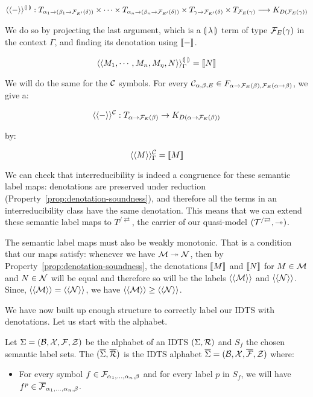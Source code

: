 $$
\langle\langle-\rangle\rangle^{\llparenthesis \,  \, \rrparenthesis} : T_{\alpha_1 \to (\beta_1 \to \mathcal{F}_{E'}(\delta))}
\times \cdots \times T_{\alpha_n \to (\beta_n \to \mathcal{F}_{E'}(\delta))} \times
T_{\gamma \to \mathcal{F}_{E'}(\delta)} \times T_{\mathcal{F}_E(\gamma)} \longrightarrow
K_{D(\mathcal{F}_E(\gamma))}
$$

We do so by projecting the last argument, which is a $\llparenthesis \, \lambda \, \rrparenthesis$
term of type $\mathcal{F}_E(\gamma)$ in the context $\Gamma$, and finding its
denotation using $\llbracket - \rrbracket$.

$$
\langle\langle M_1, \cdots, M_n, M_\eta, N\rangle\rangle^{\llparenthesis \,  \, \rrparenthesis}_\Gamma = \llbracket N \rrbracket
$$

We will do the same for the $\mathcal{C}$ symbols. For every
$\mathcal{C}_{\alpha,\beta,E} \in F_{\alpha \to \mathcal{F}_E(\beta),\mathcal{F}_E(\alpha \to
  \beta)}$, we give a:

$$
\langle\langle-\rangle\rangle^{\mathcal{C}} : T_{\alpha \to \mathcal{F}_E(\beta)} \to K_{D(\alpha \to \mathcal{F}_E(\beta))}
$$

by:

$$
\langle\langle M\rangle\rangle^{\mathcal{C}}_\Gamma = \llbracket M \rrbracket
$$

We can check that interreducibility is indeed a congruence for these
semantic label maps: denotations are preserved under reduction
(Property~\ref{prop:denotation-soundness}), and therefore all the terms in
an interreducibility class have the same denotation. This means that we can
extend these semantic label maps to $T^{/\rightleftarrows}$, the carrier of
our quasi-model $(\mathcal{T}^{/\rightleftarrows}, \twoheadrightarrow)$.

The semantic label maps must also be weakly monotonic. That is a condition
that our maps satisfy: whenever we have $\mathcal{M} \twoheadrightarrow \mathcal{N}$, then by
Property~\ref{prop:denotation-soundness}, the denotations $\llbracket M \rrbracket$ and
$\llbracket N \rrbracket$ for $M \in \mathcal{M}$ and $N \in \mathcal{N}$ will be equal and therefore so
will be the labels $\langle\langle\mathcal{M}\rangle\rangle$ and $\langle\langle\mathcal{N}\rangle\rangle$. Since,
$\langle\langle\mathcal{M}\rangle\rangle = \langle\langle\mathcal{N}\rangle\rangle$, we have $\langle\langle\mathcal{M}\rangle\rangle \ge \langle\langle\mathcal{N}\rangle\rangle$.

We have now built up enough structure to correctly label our IDTS with
denotations. Let us start with the alphabet.

\begin{definition}
  Let $\Sigma = (\mathcal{B}, \mathcal{X}, \mathcal{F}, \mathcal{Z})$ be the alphabet of an IDTS
  $(\Sigma, \mathcal{R})$ and $S_f$ the chosen semantic label sets. The
  $(\overline{\Sigma}, \overline{\mathcal{R}})$ is the IDTS alphabet
  $\overline{\Sigma} = (\mathcal{B}, \mathcal{X}, \overline{\mathcal{F}}, \mathcal{Z})$ where:

  \begin{itemize}
  \item For every symbol $f \in \mathcal{F}_{\alpha_1,\ldots,\alpha_n,\beta}$ and
    for every label $p$ in $S_f$, we will have
    $f^p \in \overline{\mathcal{F}}_{\alpha_1,\ldots,\alpha_n,\beta}$.
  \end{itemize}
\end{definition}


